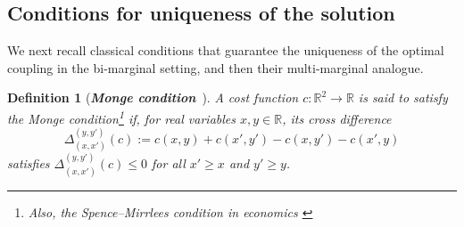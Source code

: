 \documentclass[11pt]{article}
\newcommand{\calT}{{\mathcal T}}
\newcommand{\R}{\mathbb R}
\newcommand{\purple}{\color{purple}}
\newcommand{\black}{\color{black}}
\newtheorem{definition}{Definition}
\begin{document}

\subsection{Conditions for uniqueness of the solution}
We next recall classical conditions that guarantee the uniqueness of the optimal coupling in the bi-marginal setting, and then their multi-marginal analogue.

\begin{definition}[{\it \bf Monge condition}~\cite{rachev1998mass}]\label{def:monge}
A cost function $c:\mathbb{R}^2 \to \mathbb{R}$ is said to satisfy the Monge condition\footnote{Also, the Spence--Mirrlees condition in economics \cite{chiappori2016multidimensional,santambrogio2015optimal}} if, for real variables $x,y \in \mathbb{R}$, its cross difference
$$
\Delta_{(x,x')}^{(y,y')}(c)
:= c(x,y) + c(x',y') - c(x,y') - c(x',y)
$$
satisfies $\Delta_{(x,x')}^{(y,y')}(c) \leq 0$ for all $x' \geq x$ and $y' \geq y$.
\end{definition}


\end{document}

